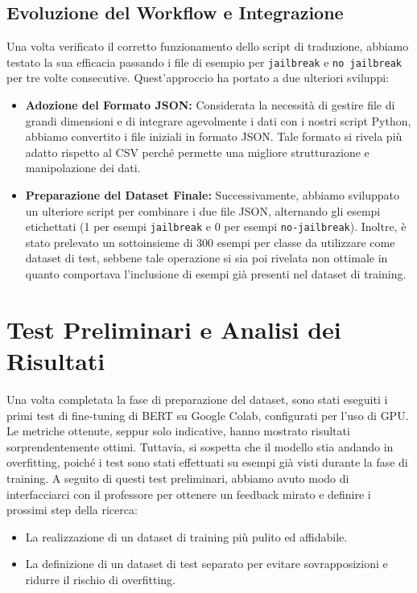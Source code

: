 \documentclass[a4paper,12pt]{article}
\begin{document}
\subsection{Evoluzione del Workflow e Integrazione}
Una volta verificato il corretto funzionamento dello script di traduzione, abbiamo testato la sua efficacia passando i file di esempio per \texttt{jailbreak} e \texttt{no jailbreak} per tre volte consecutive. Quest'approccio ha portato a due ulteriori sviluppi:
\begin{itemize}
    \item \textbf{Adozione del Formato JSON:} Considerata la necessità di gestire file di grandi dimensioni e di integrare agevolmente i dati con i nostri script Python, abbiamo convertito i file iniziali in formato JSON. Tale formato si rivela più adatto rispetto al CSV perché permette una migliore strutturazione e manipolazione dei dati.
    \item \textbf{Preparazione del Dataset Finale:} Successivamente, abbiamo sviluppato un ulteriore script per combinare i due file JSON, alternando gli esempi etichettati (1 per esempi \texttt{jailbreak} e 0 per esempi  \texttt{no-jailbreak}). Inoltre, è stato prelevato un sottoinsieme di 300 esempi per classe da utilizzare come dataset di test, sebbene tale operazione si sia poi rivelata non ottimale in quanto comportava l’inclusione di esempi già presenti nel dataset di training.
\end{itemize}

\section{Test Preliminari e Analisi dei Risultati}
Una volta completata la fase di preparazione del dataset, sono stati eseguiti i primi test di fine-tuning di BERT su Google Colab, configurati per l’uso di GPU. Le metriche ottenute, seppur solo indicative, hanno mostrato risultati sorprendentemente ottimi. Tuttavia, si sospetta che il modello stia andando in overfitting, poiché i test sono stati effettuati su esempi già visti durante la fase di training. A seguito di questi test preliminari, abbiamo avuto modo di interfacciarci con il professore per ottenere un feedback mirato e definire i prossimi step della ricerca:
\begin{itemize}
    \item La realizzazione di un dataset di training più pulito ed affidabile.
    \item La definizione di un dataset di test separato per evitare sovrapposizioni e ridurre il rischio di overfitting.
\end{itemize}
\end{document}
